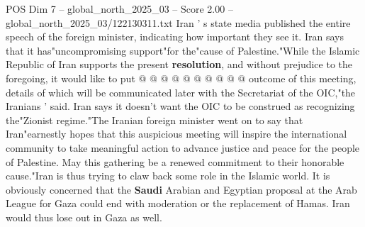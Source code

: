 \begin{textsample}{POS Dim 7 – global\_north\_2025\_03 – Score 2.00 – global\_north\_2025\_03/122130311.txt}
Iran ' s state media published the entire speech of the foreign minister, indicating how important they see it.
Iran says that it has"uncompromising support"for the"cause of Palestine."While the Islamic Republic of Iran supports the present \textbf{resolution}, and without prejudice to the foregoing, it would like to put @ @ @ @ @ @ @ @ @ @ outcome of this meeting, details of which will be communicated later with the Secretariat of the OIC,"the Iranians ' said.
Iran says it doesn't want the OIC to be construed as recognizing the"Zionist regime."The Iranian foreign minister went on to say that Iran"earnestly hopes that this auspicious meeting will inspire the international community to take meaningful action to advance justice and peace for the people of Palestine.
May this gathering be a renewed commitment to their honorable cause."Iran is thus trying to claw back some role in the Islamic world.
It is obviously concerned that the \textbf{Saudi} Arabian and Egyptian proposal at the Arab League for Gaza could end with moderation or the replacement of Hamas.
Iran would thus lose out in Gaza as well.

\end{textsample}
